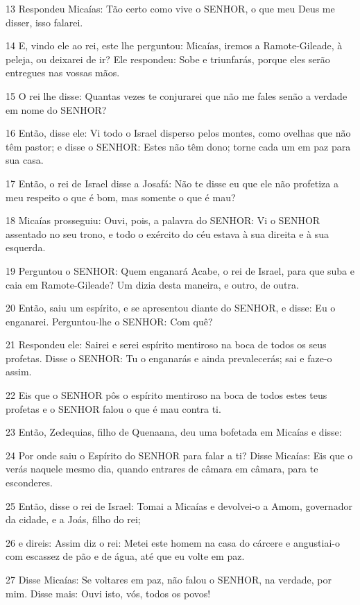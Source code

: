 \par 13 Respondeu Micaías: Tão certo como vive o SENHOR, o que meu Deus me disser, isso falarei.
\par 14 E, vindo ele ao rei, este lhe perguntou: Micaías, iremos a Ramote-Gileade, à peleja, ou deixarei de ir? Ele respondeu: Sobe e triunfarás, porque eles serão entregues nas vossas mãos.
\par 15 O rei lhe disse: Quantas vezes te conjurarei que não me fales senão a verdade em nome do SENHOR?
\par 16 Então, disse ele: Vi todo o Israel disperso pelos montes, como ovelhas que não têm pastor; e disse o SENHOR: Estes não têm dono; torne cada um em paz para sua casa.
\par 17 Então, o rei de Israel disse a Josafá: Não te disse eu que ele não profetiza a meu respeito o que é bom, mas somente o que é mau?
\par 18 Micaías prosseguiu: Ouvi, pois, a palavra do SENHOR: Vi o SENHOR assentado no seu trono, e todo o exército do céu estava à sua direita e à sua esquerda.
\par 19 Perguntou o SENHOR: Quem enganará Acabe, o rei de Israel, para que suba e caia em Ramote-Gileade? Um dizia desta maneira, e outro, de outra.
\par 20 Então, saiu um espírito, e se apresentou diante do SENHOR, e disse: Eu o enganarei. Perguntou-lhe o SENHOR: Com quê?
\par 21 Respondeu ele: Sairei e serei espírito mentiroso na boca de todos os seus profetas. Disse o SENHOR: Tu o enganarás e ainda prevalecerás; sai e faze-o assim.
\par 22 Eis que o SENHOR pôs o espírito mentiroso na boca de todos estes teus profetas e o SENHOR falou o que é mau contra ti.
\par 23 Então, Zedequias, filho de Quenaana, deu uma bofetada em Micaías e disse:
\par 24 Por onde saiu o Espírito do SENHOR para falar a ti? Disse Micaías: Eis que o verás naquele mesmo dia, quando entrares de câmara em câmara, para te esconderes.
\par 25 Então, disse o rei de Israel: Tomai a Micaías e devolvei-o a Amom, governador da cidade, e a Joás, filho do rei;
\par 26 e direis: Assim diz o rei: Metei este homem na casa do cárcere e angustiai-o com escassez de pão e de água, até que eu volte em paz.
\par 27 Disse Micaías: Se voltares em paz, não falou o SENHOR, na verdade, por mim. Disse mais: Ouvi isto, vós, todos os povos!
